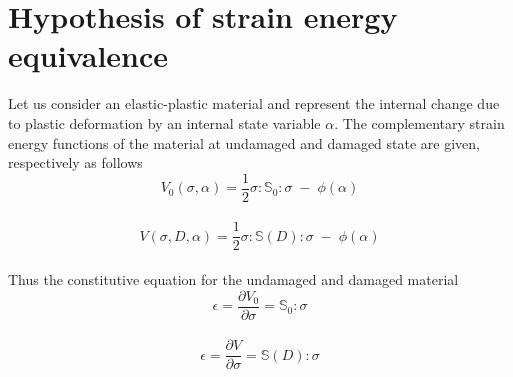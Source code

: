 \documentclass[a4paper,12pt,twoside]{report}
\begin{document}
\section{Hypothesis of strain energy equivalence}\label{Hypothesis of strain energy equivalence}
\indent\indent\indent Let us consider an elastic-plastic material and represent the internal change due to plastic deformation by an internal state variable $\alpha$. The complementary strain energy functions of the material at undamaged and damaged state are given, respectively as follows
\\
\begin{equation}
V_{0}(\sigma,\alpha) = \frac{1}{2}\sigma : \mathbb{S}_{0} : \sigma \; - \; \phi(\alpha)
\end{equation}
\\
\begin{equation}
V(\sigma,D,\alpha) = \frac{1}{2}\sigma : \mathbb{S}(D) : \sigma \; - \; \phi(\alpha)
\end{equation}
\\
Thus the constitutive equation for the undamaged and damaged material 
\\
\begin{equation}
\epsilon = \frac{\partial V_{0} }{\partial \sigma} = \mathbb{S}_{0} : \sigma
\end{equation}
\\
\begin{equation}
\epsilon = \frac{\partial V }{\partial \sigma} = \mathbb{S}(D) : \sigma
\label{eqn:Strain_energy_eq}
\end{equation}
\end{document}
